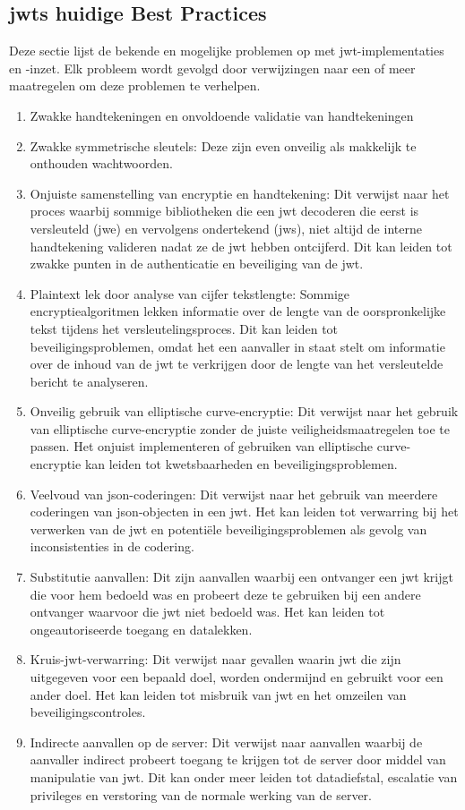   \subsection{\gls{jwts} huidige Best Practices}%
  \label{subsec:jwt-huidige-best-practices}
  Deze sectie lijst de bekende en mogelijke problemen op met \gls{jwt}-implementaties en -inzet. Elk probleem wordt gevolgd door verwijzingen naar een of meer maatregelen om deze problemen te verhelpen.
  \begin{enumerate}[label=\textbf{-}]
      \item Zwakke handtekeningen en onvoldoende validatie van handtekeningen
      \item Zwakke symmetrische sleutels: Deze zijn even onveilig als makkelijk te onthouden wachtwoorden.
      \item Onjuiste samenstelling van encryptie en handtekening: Dit verwijst naar het proces waarbij sommige bibliotheken die een \gls{jwt} decoderen die eerst is versleuteld (\gls{jwe}) en vervolgens ondertekend (\gls{jws}), niet altijd de interne handtekening valideren nadat ze de \gls{jwt} hebben ontcijferd. Dit kan leiden tot zwakke punten in de authenticatie en beveiliging van de \gls{jwt}.
      \item Plaintext lek door analyse van cijfer tekstlengte: Sommige encryptiealgoritmen lekken informatie over de lengte van de oorspronkelijke tekst tijdens het versleutelingsproces. Dit kan leiden tot beveiligingsproblemen, omdat het een aanvaller in staat stelt om informatie over de inhoud van de \gls{jwt} te verkrijgen door de lengte van het versleutelde bericht te analyseren.
      \item Onveilig gebruik van elliptische curve-encryptie: Dit verwijst naar het gebruik van elliptische curve-encryptie zonder de juiste veiligheidsmaatregelen toe te passen. Het onjuist implementeren of gebruiken van elliptische curve-encryptie kan leiden tot kwetsbaarheden en beveiligingsproblemen.
      \item Veelvoud van \gls{json}-coderingen: Dit verwijst naar het gebruik van meerdere coderingen van \gls{json}-objecten in een \gls{jwt}. Het kan leiden tot verwarring bij het verwerken van de \gls{jwt} en potentiële beveiligingsproblemen als gevolg van inconsistenties in de codering.
      \item Substitutie aanvallen: Dit zijn aanvallen waarbij een ontvanger een \gls{jwt} krijgt die voor hem bedoeld was en probeert deze te gebruiken bij een andere ontvanger waarvoor die \gls{jwt} niet bedoeld was. Het kan leiden tot ongeautoriseerde toegang en datalekken.
      \item Kruis-\gls{jwt}-verwarring: Dit verwijst naar gevallen waarin \gls{jwt} die zijn uitgegeven voor een bepaald doel, worden ondermijnd en gebruikt voor een ander doel. Het kan leiden tot misbruik van \gls{jwt} en het omzeilen van beveiligingscontroles.
      \item Indirecte aanvallen op de server: Dit verwijst naar aanvallen waarbij de aanvaller indirect probeert toegang te krijgen tot de server door middel van manipulatie van \gls{jwt}. Dit kan onder meer leiden tot datadiefstal, escalatie van privileges en verstoring van de normale werking van de server.
  \end{enumerate}
